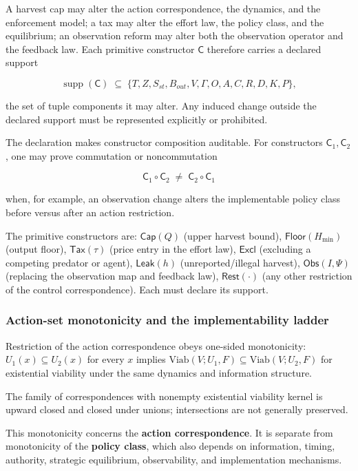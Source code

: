 A harvest cap may alter the action correspondence, the dynamics, and the enforcement model; a tax may alter the effort law, the policy class, and the equilibrium; an observation reform may alter both the observation operator and the feedback law. Each primitive constructor $\mathsf{C}$ therefore carries a declared support

\[\operatorname{supp}(\mathsf{C}) \;\subseteq\; \{ T, Z, S_{st}, B_{out}, V, \Gamma, O, A, C, R, D, K, P \},\]

the set of tuple components it may alter. Any induced change outside the declared support must be represented explicitly or prohibited.

The declaration makes constructor composition auditable. For constructors $\mathsf{C}_1, \mathsf{C}_2$, one may prove commutation or noncommutation

\[\mathsf{C}_1 \circ \mathsf{C}_2 \;\neq\; \mathsf{C}_2 \circ \mathsf{C}_1\]

when, for example, an observation change alters the implementable policy class before versus after an action restriction.

The primitive constructors are: $\mathsf{Cap}(Q)$ (upper harvest bound), $\mathsf{Floor}(H_{\min})$ (output floor), $\mathsf{Tax}(\tau)$ (price entry in the effort law), $\mathsf{Excl}$ (excluding a competing predator or agent), $\mathsf{Leak}(h)$ (unreported/illegal harvest), $\mathsf{Obs}(I, \Psi)$ (replacing the observation map and feedback law), $\mathsf{Rest}(\cdot)$ (any other restriction of the control correspondence). Each must declare its support.


\subsubsection{Action-set monotonicity and the implementability ladder}

Restriction of the action correspondence obeys one-sided monotonicity: $U_1(x) \subseteq U_2(x)$ for every $x$ implies $\mathrm{Viab}(V; U_1, F) \subseteq \mathrm{Viab}(V; U_2, F)$ for existential viability under the same dynamics and information structure.

The family of correspondences with nonempty existential viability kernel is upward closed and closed under unions; intersections are not generally preserved.

This monotonicity concerns the \textbf{action correspondence}. It is separate from monotonicity of the \textbf{policy class}, which also depends on information, timing, authority, strategic equilibrium, observability, and implementation mechanisms.

